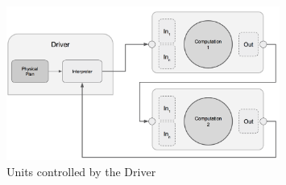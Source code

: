 \begin{figure}[ht]
\centering
\includegraphics[width=0.8\textwidth]{img/driver_units.png}
\caption{Units controlled by the Driver}
\label{fig:driver_units}
\end{figure}

